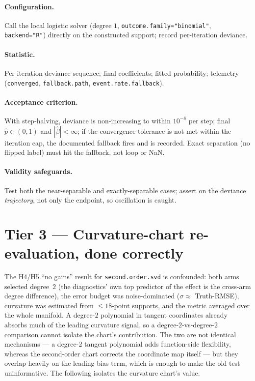 \documentclass[11pt]{article}
\newcommand{\code}[1]{\texttt{#1}}
\begin{document}
\paragraph{Configuration.} Call the local logistic solver (degree $1$, \code{outcome.family="binomial"},
\code{backend="R"}) directly on the constructed support; record per-iteration deviance.

\paragraph{Statistic.} Per-iteration deviance sequence; final coefficients; fitted probability;
telemetry (\code{converged}, \code{fallback.path}, \code{event.rate.fallback}).

\paragraph{Acceptance criterion.} With step-halving, deviance is non-increasing to within
$10^{-8}$ per step; final $\hat p\in(0,1)$ and $|\hat\beta|<\infty$; if the convergence tolerance
is not met within the iteration cap, the documented fallback fires and is recorded. Exact
separation (no flipped label) must hit the fallback, not loop or NaN.

\paragraph{Validity safeguards.} Test both the near-separable and exactly-separable cases; assert
on the deviance \emph{trajectory}, not only the endpoint, so oscillation is caught.

\section{Tier 3 — Curvature-chart re-evaluation, done correctly}

The H4/H5 ``no gains'' result for \code{second.order.svd} is confounded: both arms selected
degree~$2$ (the diagnostics' own top predictor of the effect is the cross-arm degree
difference), the error budget was noise-dominated ($\sigma\!\approx\!$ Truth-RMSE), curvature was
estimated from $\le 18$-point supports, and the metric averaged over the whole manifold. A
degree-$2$ polynomial in tangent coordinates already absorbs much of the leading curvature
signal, so a degree-$2$-vs-degree-$2$ comparison cannot isolate the chart's contribution. The
two are not identical mechanisms --- a degree-$2$ tangent polynomial adds function-side
flexibility, whereas the second-order chart corrects the coordinate map itself --- but they
overlap heavily on the leading bias term, which is enough to make the old test uninformative.
The following isolates the curvature chart's value.
\end{document}
